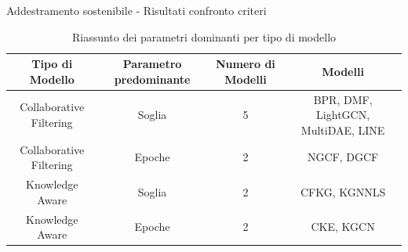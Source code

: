 \begin{frame}{Addestramento sostenibile - Risultati confronto criteri}
\begin{table}[H]
    \scriptsize
    \centering
        \begin{tabular}{|c|c|c|c|}
            \hline
            \textbf{Tipo di Modello} & \textbf{Parametro predominante} & \textbf{Numero di Modelli} & \textbf{Modelli} \\ \hline
            Collaborative Filtering & Soglia & 5 & BPR, DMF, LightGCN, MultiDAE, LINE \\ \hline
            Collaborative Filtering & Epoche & 2 & NGCF, DGCF \\ \hline
            Knowledge Aware & Soglia & 2 & CFKG, KGNNLS \\ \hline
            Knowledge Aware & Epoche & 2 & CKE, KGCN \\ \hline
        \end{tabular}
    \caption{Riassunto dei parametri dominanti per tipo di modello}
\end{table}

\end{frame}